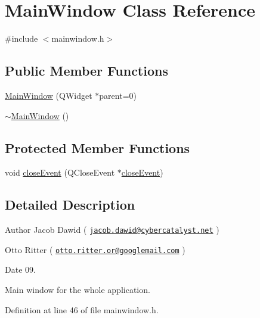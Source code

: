 \hypertarget{classMainWindow}{\section{\-Main\-Window \-Class \-Reference}
\label{d6/d1a/classMainWindow}
}


{\ttfamily \#include $<$mainwindow.\-h$>$}

\subsection*{\-Public \-Member \-Functions}
\begin{DoxyCompactItemize}
\item 
\hyperlink{classMainWindow_a8b244be8b7b7db1b08de2a2acb9409db}{\-Main\-Window} (\-Q\-Widget $\ast$parent=0)
\item 
\hyperlink{classMainWindow_ae98d00a93bc118200eeef9f9bba1dba7}{$\sim$\-Main\-Window} ()
\end{DoxyCompactItemize}
\subsection*{\-Protected \-Member \-Functions}
\begin{DoxyCompactItemize}
\item 
void \hyperlink{classMainWindow_ae9a24152987af97d19e1af8ea6bd064e}{close\-Event} (\-Q\-Close\-Event $\ast$\hyperlink{classMainWindow_ae9a24152987af97d19e1af8ea6bd064e}{close\-Event})
\end{DoxyCompactItemize}


\subsection{\-Detailed \-Description}
\begin{DoxyAuthor}{\-Author}
\-Jacob \-Dawid ( \href{mailto:jacob.dawid@cybercatalyst.net}{\tt jacob.\-dawid@cybercatalyst.\-net} ) 

\-Otto \-Ritter ( \href{mailto:otto.ritter.or@googlemail.com}{\tt otto.\-ritter.\-or@googlemail.\-com} ) 
\end{DoxyAuthor}
\begin{DoxyDate}{\-Date}
09.
\end{DoxyDate}
\-Main window for the whole application. 

\-Definition at line 46 of file mainwindow.\-h.



